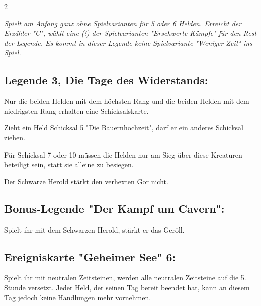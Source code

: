 \documentclass[10pt, a4paper, oneside]{book}
\newcommand{\fan}[1]{\textit{#1}}
\begin{document}
\begin{multicols*}{2}
\begin{bgcolor}
\fan{Spielt am Anfang ganz ohne Spielvarianten für 5 oder 6 Helden. Erreicht der Erzähler "C", wählt eine (!) der Spielvarianten "Erschwerte Kämpfe" für den Rest der Legende. Es kommt in dieser Legende keine Spielvariante "Weniger Zeit" ins Spiel.}









\subsection{Legende 3, Die Tage des Widerstands:}



Nur die beiden Helden mit dem höchsten Rang und die beiden Helden mit dem niedrigsten Rang erhalten eine Schicksalskarte.
\supercite{NH:Begleitheft,DH:Begleitheft,MH:Begleitheft,BiBo:Bonus-Heft}


Zieht ein Held Schicksal 5 "Die Bauernhochzeit", darf er ein anderes Schicksal ziehen.
\supercite{NH:Begleitheft,DH:Begleitheft,MH:Begleitheft,BiBo:Bonus-Heft}

Für Schicksal 7 oder 10 müssen die Helden nur am Sieg über diese Kreaturen beteiligt sein, statt sie alleine zu besiegen.
\supercite{NH:Begleitheft,DH:Begleitheft,MH:Begleitheft,BiBo:Bonus-Heft}

Der Schwarze Herold stärkt den verhexten Gor nicht.
\supercite{NH:Begleitheft,DH:Begleitheft,BiBo:Bonus-Heft}





\subsection{Bonus-Legende "Der Kampf um Cavern":}

Spielt ihr mit dem Schwarzen Herold, stärkt er das Geröll.
\supercite{BL_KuC:B}




\subsection{Ereigniskarte "Geheimer See" 6:}

Spielt ihr mit neutralen Zeitsteinen, werden alle neutralen Zeitsteine auf die 5. Stunde versetzt. Jeder Held, der seinen Tag bereit beendet hat, kann an diesem Tag jedoch keine Handlungen mehr vornehmen.
\supercite{NH:Begleitheft,DH:Begleitheft,MH:Begleitheft,BiBo:Bonus-Heft}


\end{bgcolor}
\end{multicols*}
\end{document}
